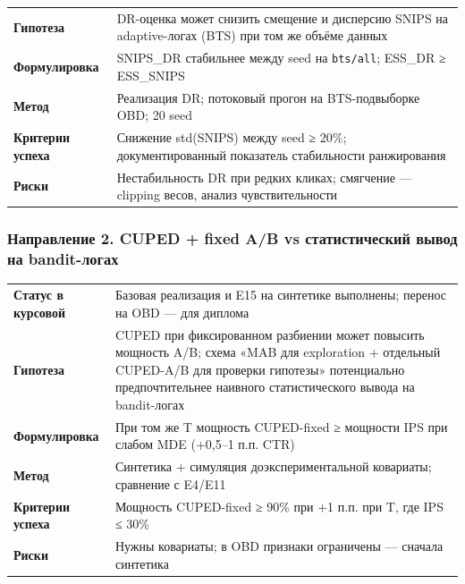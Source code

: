 \begingroup\footnotesize\setlength{\tabcolsep}{4pt}
\begin{xltabular}{\linewidth}{@{}
  >{\raggedright\arraybackslash}Y
  >{\raggedright\arraybackslash}Y@{}}
\toprule\noalign{}
\midrule\noalign{}
\endhead
\bottomrule\noalign{}
\endlastfoot
\textbf{Гипотеза} & DR-оценка \cite{ref27} может снизить смещение и дисперсию SNIPS на adaptive-логах (BTS) при том же объёме данных \\
\textbf{Формулировка} & SNIPS\_DR стабильнее между seed на \texttt{bts/all}; ESS\_DR ≥ ESS\_SNIPS \\
\textbf{Метод} & Реализация DR; потоковый прогон на BTS-подвыборке OBD; 20 seed \\
\textbf{Критерии успеха} & Снижение std(SNIPS) между seed ≥ 20\%; документированный показатель стабильности ранжирования \\
\textbf{Риски} & Нестабильность DR при редких кликах; смягчение --- clipping весов, анализ чувствительности \\
\end{xltabular}
\endgroup

\subsubsection{Направление 2. CUPED + fixed A/B vs статистический вывод на bandit-логах}\label{ux43dux430ux43fux440ux430ux432ux43bux435ux43dux438ux435-2.-cuped-fixed-ab-vs-ux441ux442ux430ux442ux438ux441ux442ux438ux447ux435ux441ux43aux438ux439-ux432ux44bux432ux43eux434-ux43dux430-bandit-ux43bux43eux433ux430ux445}

\begingroup\footnotesize\setlength{\tabcolsep}{4pt}
\begin{xltabular}{\linewidth}{@{}
  >{\raggedright\arraybackslash}Y
  >{\raggedright\arraybackslash}Y@{}}
\toprule\noalign{}
\midrule\noalign{}
\endhead
\bottomrule\noalign{}
\endlastfoot
\textbf{Статус в курсовой} & Базовая реализация и E15 на синтетике выполнены; перенос на OBD --- для диплома \\
\textbf{Гипотеза} & CUPED \cite{ref7} при фиксированном разбиении может повысить мощность A/B; схема «MAB для exploration + отдельный CUPED-A/B для проверки гипотезы» потенциально предпочтительнее наивного статистического вывода на bandit-логах \\
\textbf{Формулировка} & При том же T мощность CUPED-fixed ≥ мощности IPS при слабом MDE (+0,5--1 п.п. CTR) \\
\textbf{Метод} & Синтетика + симуляция доэкспериментальной ковариаты; сравнение с E4/E11 \\
\textbf{Критерии успеха} & Мощность CUPED-fixed ≥ 90\% при +1 п.п. при T, где IPS ≤ 30\% \\
\textbf{Риски} & Нужны ковариаты; в OBD признаки ограничены --- сначала синтетика \\
\end{xltabular}
\endgroup

